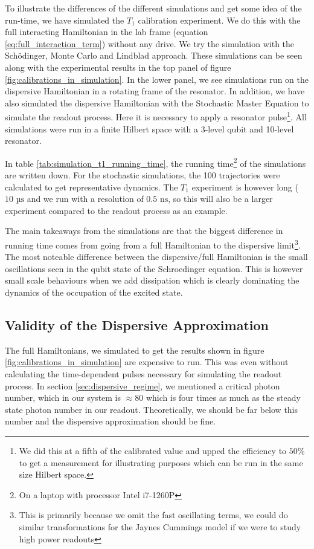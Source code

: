 To illustrate the differences of the different simulations and get some idea of the run-time, we have simulated the $T_1$ calibration experiment. We do this with the full interacting Hamiltonian in the lab frame (equation \ref{eq:full_interaction_term}) without any drive. We try the simulation with the Schödinger, Monte Carlo and Lindblad approach. These simulations can be seen along with the experimental results in the top panel of figure \ref{fig:calibrations_in_simulation}. In the lower panel, we see simulations run on the dispersive Hamiltonian in a rotating frame of the resonator. In addition, we have also simulated the dispersive Hamiltonian with the Stochastic Master Equation to simulate the readout process. Here it is necessary to apply a resonator pulse\footnote{We did this at a fifth of the calibrated value and upped the efficiency to $50\%$ to get a measurement for illustrating purposes which can be run in the same size Hilbert space.}. All simulations were run in a finite Hilbert space with a 3-level qubit and 10-level resonator.

In table \ref{tab:simulation_t1_running_time}, the running time\footnote{On a laptop with processor Intel i7-1260P} of the simulations are written down. For the stochastic simulations, the 100 trajectories were calculated to get representative dynamics. The $T_1$ experiment is however long ($10 \text{ µs}$ and we run with a resolution of $0.5 \text{ ns}$, so this will also be a larger experiment compared to the readout process as an example. 

The main takeaways from the simulations are that the biggest difference in running time comes from going from a full Hamiltonian to the dispersive limit\footnote{This is primarily because we omit the fast oscillating terms, we could do similar transformations for the Jaynes Cummings model if we were to study high power readouts}. The most noteable difference between the dispersive/full Hamiltonian is the small oscillations seen in the qubit state of the Schroedinger equation. This is however small scale behaviours when we add dissipation which is clearly dominating the dynamics of the occupation of the excited state. 


\subsection{Validity of the Dispersive Approximation}
The full Hamiltonians, we simulated to get the results shown in figure \ref{fig:calibrations_in_simulation} are expensive to run. This was even without calculating the time-dependent pulses necessary for simulating the readout process. In section \ref{sec:dispersive_regime}, we mentioned a critical photon number, which in our system is $\approx 80$ which is four times as much as the steady state photon number in our readout. Theoretically, we should be far below this number and the dispersive approximation should be fine.

